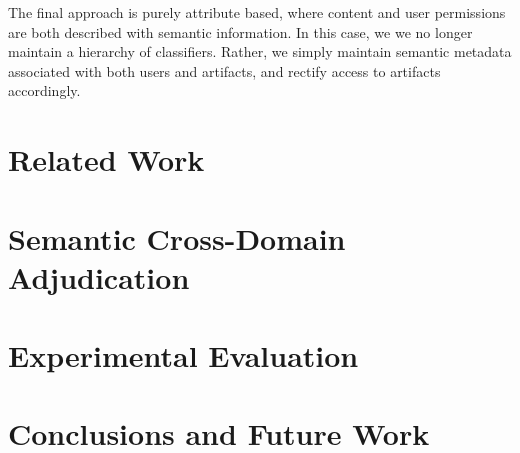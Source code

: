\documentclass[10pt,letterpaper]{article}
\begin{document}
The final approach is purely attribute based, where content and user permissions are both described with semantic information.  In this case, we we no longer maintain a hierarchy of classifiers.  Rather, we simply maintain semantic metadata associated with both users and artifacts, and rectify access to artifacts accordingly.
\section{Related Work}

\section{Semantic Cross-Domain Adjudication}

\section{Experimental Evaluation}

\section{Conclusions and Future Work}
\end{document}

